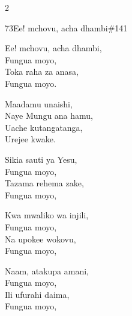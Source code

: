 \begin{multicols}{2}
\begin{hymn}{73}{Ee! mchovu, acha dhambi}{\#141}
\begin{stanza}
Ee! mchovu, acha dhambi,\\
Fungua moyo,\\
Toka raha za anasa,\\
Fungua moyo.
\end{stanza}
\begin{chorus}
Maadamu unaishi,\\
Naye Mungu ana hamu,\\
Uache kutangatanga,\\
Urejee kwake.
\end{chorus}
\begin{stanza}
Sikia sauti ya Yesu,\\
Fungua moyo,\\
Tazama rehema zake,\\
Fungua moyo,
\end{stanza}
\begin{stanza}
Kwa mwaliko wa injili,\\
Fungua moyo,\\
Na upokee wokovu,\\
Fungua moyo,
\end{stanza}
\begin{stanza}
Naam, atakupa amani,\\
Fungua moyo,\\
Ili ufurahi daima,\\
Fungua moyo,
\end{stanza}
\end{hymn}


\end{multicols}
